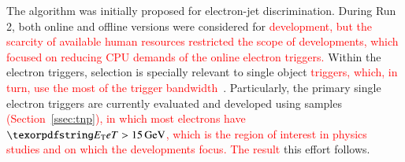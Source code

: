 

The \rnn{} algorithm was initially proposed for electron-jet discrimination. 
During Run 2, both online and offline versions
were considered for \textcolor{red}{ development, but the scarcity of available human resources restricted the scope of developments, which focused on reducing CPU demands of the online electron triggers.} Within the electron triggers, \hlt{} selection is
specially relevant to single object \textcolor{red}{triggers, which, in turn, use the most of the trigger bandwidth}~\cite{aad2020performance}. Particularly, the primary single electron triggers
are currently evaluated and developed using \Zee{} \tnp{} samples 
\textcolor{red}{(Section~\ref{ssec:tnp}), in which most electrons have $\et>\SI{15}{\GeV}$, which is the region of interest in physics studies and on which the \rnn{} developments focus. The result} this effort
follows.

